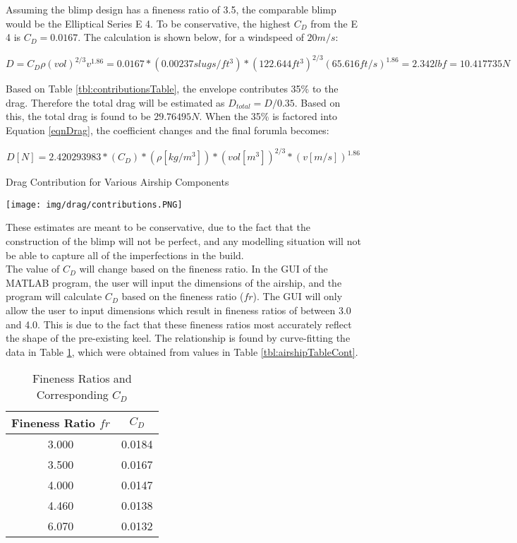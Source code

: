 \documentclass[../main.tex]{subfiles}
\begin{document}
Assuming the blimp design has a fineness ratio of 3.5, the comparable blimp would be the Elliptical Series E 4. To be conservative, the highest $C_D$ from the E 4 is $C_D = 0.0167$. The calculation is shown below, for a windspeed of $20m/s$:

\begin{equation*} \label{exDrag}
D = C_D\rho (vol)^{2/3}v^{1.86}=0.0167*(0.00237 slugs/ft^3)*(122.644 ft^3)^{2/3}(65.616 ft/s) ^{1.86} = 2.342 lbf = 10.417735N 
\end{equation*}

Based on Table \ref{tbl:contributionsTable}, the envelope contributes 35\% to the drag. Therefore the total drag will be estimated as $D_{total}=D/0.35$. Based on this, the total drag is found to be $29.76495N$. When the 35\% is factored into Equation \ref{eqnDrag}, the coefficient changes and the final forumla becomes:

\begin{equation} \label{eqnDrag2}
D[N] = 2.420293983*(C_D)*(\rho[kg/m^3])*(vol [m^3])^{2/3}*(v [m/s])^{1.86}
\end{equation}

\begin{table}[H]
	\centering
	\caption{Drag Contribution for Various Airship Components \cite{airshipAerodynamics}}
	\texttt{[image: img/drag/contributions.PNG]}
	\label{tbl:contributionsTable}
\end{table}

These estimates are meant to be conservative, due to the fact that the construction of the blimp will not be perfect, and any modelling situation will not be able to capture all of the imperfections in the build.\\

The value of $C_D$ will change based on the fineness ratio. In the GUI of the MATLAB program, the user will input the dimensions of the airship, and the program will calculate $C_D$ based on the fineness ratio ($fr$). The GUI will only allow the user to input dimensions which result in fineness ratios of between 3.0 and 4.0. This is due to the fact that these fineness ratios most accurately reflect the shape of the pre-existing keel. The relationship is found by curve-fitting the data in Table \ref{tbl:finenessCoefficient}, which were obtained from values in Table \ref{tbl:airshipTableCont}.

\begin{table}[H]
	\caption{Fineness Ratios and Corresponding $C_D$}
	\label{tbl:finenessCoefficient}
\begin{center}
	\begin{tabular}{|c|c|}
	\hline 
	\textbf{Fineness Ratio $fr$} & \textbf{$C_D$} \\ 
	\hline 
	3.000 & 0.0184 \\ 
	\hline 
	3.500 & 0.0167 \\ 
	\hline 
	4.000 & 0.0147 \\ 
	\hline
	4.460 & 0.0138 \\ 
	\hline 
	6.070 & 0.0132 \\ 
	\hline  
\end{tabular} 
\end{center}
\end{table}
\end{document}
